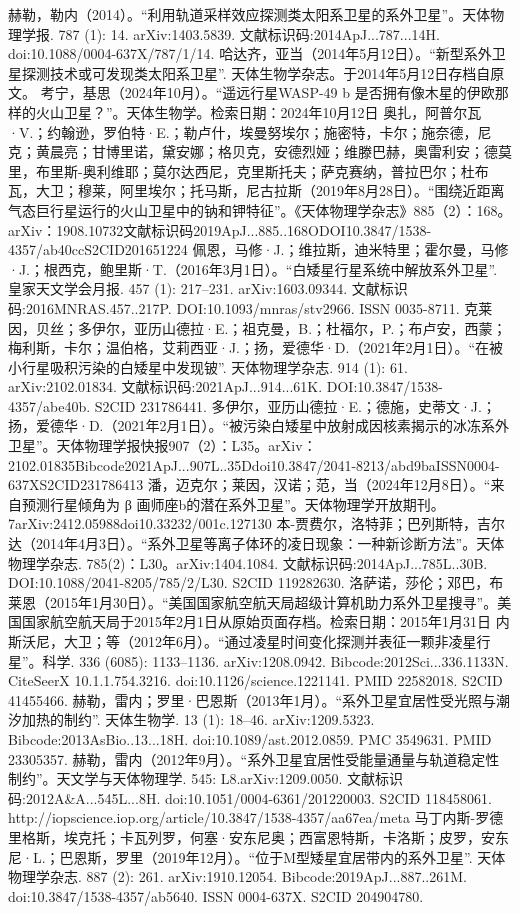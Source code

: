 \begin{enumerate}
 赫勒，勒内（2014）。“利用轨道采样效应探测类太阳系卫星的系外卫星”。天体物理学报. 787 (1): 14. arXiv:1403.5839. 文献标识码:2014ApJ...787...14H. doi:10.1088/0004-637X/787/1/14.
 哈达齐，亚当（2014年5月12日）。“新型系外卫星探测技术或可发现类太阳系卫星”. 天体生物学杂志。于2014年5月12日存档自原文。
 考宁，基思（2024年10月）。“遥远行星WASP-49 b 是否拥有像木星的伊欧那样的火山卫星？”。天体生物学。检索日期：2024年10月12日
 奥扎，阿普尔瓦·V.；约翰逊，罗伯特·E.；勒卢什，埃曼努埃尔；施密特，卡尔；施奈德，尼克；黄晨亮；甘博里诺，黛安娜；格贝克，安德烈娅；维滕巴赫，奥雷利安；德莫里，布里斯-奥利维耶；莫尔达西尼，克里斯托夫；萨克赛纳，普拉巴尔；杜布瓦，大卫；穆莱，阿里埃尔；托马斯，尼古拉斯（2019年8月28日）。“围绕近距离气态巨行星运行的火山卫星中的钠和钾特征”。《天体物理学杂志》885（2）：168。arXiv：1908.10732文献标识码2019ApJ...885..168ODOI10.3847/1538-4357/ab40ccS2CID201651224
 佩恩，马修·J.；维拉斯，迪米特里；霍尔曼，马修·J.；根西克，鲍里斯·T.（2016年3月1日）。“白矮星行星系统中解放系外卫星”. 皇家天文学会月报. 457 (1): 217–231. arXiv:1603.09344. 文献标识码:2016MNRAS.457..217P. DOI:10.1093/mnras/stv2966. ISSN 0035-8711.
 克莱因，贝丝；多伊尔，亚历山德拉·E.；祖克曼，B.；杜福尔，P.；布卢安，西蒙；梅利斯，卡尔；温伯格，艾莉西亚·J.；扬，爱德华·D.（2021年2月1日）。“在被小行星吸积污染的白矮星中发现铍”. 天体物理学杂志. 914 (1): 61. arXiv:2102.01834. 文献标识码:2021ApJ...914...61K. DOI:10.3847/1538-4357/abe40b. S2CID 231786441.
 多伊尔，亚历山德拉·E.；德施，史蒂文·J.；扬，爱德华·D.（2021年2月1日）。“被污染白矮星中放射成因核素揭示的冰冻系外卫星”。天体物理学报快报907（2）：L35。arXiv：2102.01835Bibcode2021ApJ...907L..35Ddoi10.3847/2041-8213/abd9baISSN0004-637XS2CID231786413
 潘，迈克尔；莱因，汉诺；范，当（2024年12月8日）。“来自预测行星倾角为
β
 画师座b的潜在系外卫星”。天体物理学开放期刊。7arXiv:2412.05988doi10.33232/001c.127130
 本-贾费尔，洛特菲；巴列斯特，吉尔达（2014年4月3日）。“系外卫星等离子体环的凌日现象：一种新诊断方法”。天体物理学杂志. 785(2)：L30。arXiv:1404.1084. 文献标识码:2014ApJ...785L..30B. DOI:10.1088/2041-8205/785/2/L30. S2CID 119282630.
 洛萨诺，莎伦；邓巴，布莱恩（2015年1月30日）。“美国国家航空航天局超级计算机助力系外卫星搜寻”。美国国家航空航天局于2015年2月1日从原始页面存档。检索日期：2015年1月31日
 内斯沃尼，大卫；等（2012年6月）。“通过凌星时间变化探测并表征一颗非凌星行星”。科学. 336 (6085): 1133–1136. arXiv:1208.0942. Bibcode:2012Sci...336.1133N. CiteSeerX 10.1.1.754.3216. doi:10.1126/science.1221141. PMID 22582018. S2CID 41455466.
 赫勒，雷内；罗里·巴恩斯（2013年1月）。“系外卫星宜居性受光照与潮汐加热的制约”. 天体生物学. 13 (1): 18–46. arXiv:1209.5323. Bibcode:2013AsBio..13...18H. doi:10.1089/ast.2012.0859. PMC 3549631. PMID 23305357.
 赫勒，雷内（2012年9月）。“系外卫星宜居性受能量通量与轨道稳定性制约”。天文学与天体物理学. 545: L8.arXiv:1209.0050. 文献标识码:2012A&A...545L...8H. doi:10.1051/0004-6361/201220003. S2CID 118458061.
 http://iopscience.iop.org/article/10.3847/1538-4357/aa67ea/meta
 马丁内斯-罗德里格斯，埃克托；卡瓦列罗，何塞·安东尼奥；西富恩特斯，卡洛斯；皮罗，安东尼·L.；巴恩斯，罗里（2019年12月）。“位于M型矮星宜居带内的系外卫星”. 天体物理学杂志. 887 (2): 261. arXiv:1910.12054. Bibcode:2019ApJ...887..261M. doi:10.3847/1538-4357/ab5640. ISSN 0004-637X. S2CID 204904780.
\end{enumerate}
